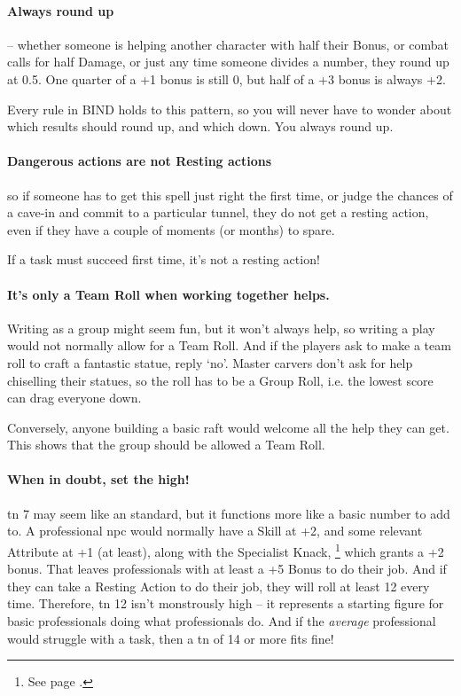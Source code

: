 \begin{multicols}{2}
\begin{scriptsize}
\begin{boxtable}[clXX]
\end{boxtable}
\end{scriptsize}

\paragraph{Always round up} -- whether someone is helping another character with half their Bonus, or combat calls for half Damage, or just any time someone divides a number, they round up at 0.5.
One quarter of a +1 bonus is still 0, but half of a +3 bonus is always +2.

Every rule in BIND holds to this pattern, so you will never have to wonder about which results should round up, and which down.
You always round up.

\paragraph{Dangerous actions are not Resting actions}
so if someone has to get this spell just right the first time, or judge the chances of a cave-in and commit to a particular tunnel, they do not get a resting action, even if they have a couple of moments (or months) to spare.

If a task must succeed first time, it's not a resting action!

\paragraph{It's only a Team Roll when working together helps.}
Writing as a group might seem fun, but it won't always help, so writing a play would not normally allow for a Team Roll.
And if the players ask to make a team roll to craft a fantastic statue, reply `no'.
Master carvers don't ask for help chiselling their statues, so the roll has to be a Group Roll, i.e. the lowest score can drag everyone down.

Conversely, anyone building a basic raft would welcome all the help they can get.
This shows that the group should be allowed a Team Roll.

\paragraph{When in doubt, set the  high!}
\Gls{tn} 7 may seem like an standard, but it functions more like a basic number to add to.
A professional \gls{npc} would normally have a Skill at +2, and some relevant Attribute at +1 (at least), along with the Specialist Knack,%
\footnote{See page \pageref{specialist}.}
which grants a +2 bonus.
That leaves professionals with at least a +5 Bonus to do their job.
And if they can take a Resting Action to do their job, they will roll at least 12 every time.
Therefore, \gls{tn} 12 isn't monstrously high -- it represents a starting figure for basic professionals doing what professionals do.
And if the \emph{average} professional would struggle with a task, then a \gls{tn} of 14 or more fits fine!


\end{multicols}
